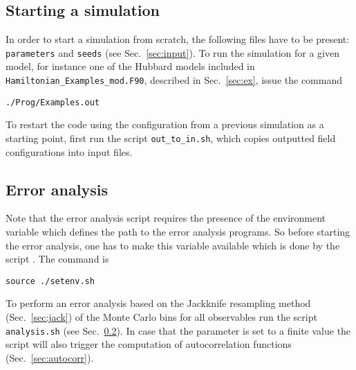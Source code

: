\subsection{Starting a simulation}
%
In order to start a simulation from scratch, the following files have to be present: \texttt{parameters} and \texttt{seeds} (see Sec.~\ref{sec:input}). 
To run the simulation for a given model, for instance one of the Hubbard models included in \texttt{Hamiltonian\_Examples\_mod.F90}, described in Sec.~\ref{sec:ex}, issue the command
\begin{lstlisting}[style=bash]
./Prog/Examples.out
\end{lstlisting}
To restart the code using the configuration from a previous simulation as a starting point, first run the script \texttt{out\_to\_in.sh}, which copies outputted field configurations into input files.
%
\subsection{Error analysis}\label{sec:analysis}
%


Note that the error analysis script requires the presence of the environment variable  which defines the path to the error analysis programs.
So before starting the error analysis, one has to make this variable available which is done by the script . The command is
\begin{verbatim}
source ./setenv.sh
\end{verbatim}
To perform an error analysis based on the Jackknife resampling method (Sec.~\ref{sec:jack})  of the Monte Carlo bins for all observables run the script \texttt{analysis.sh} 
(see Sec.~\ref{sec:analysis}). In case that the parameter  is set to a finite value the script will also trigger the computation of autocorrelation functions (Sec.~\ref{sec:autocorr}).



